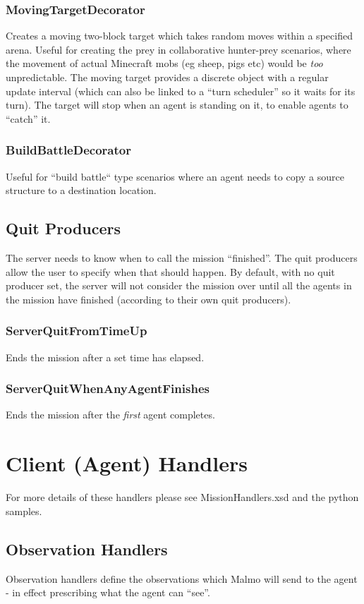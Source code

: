 \documentclass[11pt]{article} %
\begin{document}
\subsubsection{MovingTargetDecorator}
Creates a moving two-block target which takes random moves within a specified arena. Useful for creating the prey in collaborative hunter-prey scenarios, where the movement of actual Minecraft mobs (eg sheep, pigs etc) would be \emph{too} unpredictable. The moving target provides a discrete object with a regular update interval (which can also be linked to a ``turn scheduler'' so it waits for its turn). The target will stop when an agent is standing on it, to enable agents to ``catch'' it.

\subsubsection{BuildBattleDecorator}
Useful for ``build battle`` type scenarios where an agent needs to copy a source structure to a destination location.

\subsection{Quit Producers}
The server needs to know when to call the mission ``finished''. The quit producers allow the user to specify when that should happen. By default, with no quit producer set, the server will not consider the mission over until all the agents in the mission have finished (according to their own quit producers).

\subsubsection{ServerQuitFromTimeUp}
Ends the mission after a set time has elapsed.

\subsubsection{ServerQuitWhenAnyAgentFinishes}
Ends the mission after the \emph{first} agent completes.

\section{Client (Agent) Handlers}
For more details of these handlers please see MissionHandlers.xsd and the python samples.

\subsection{Observation Handlers}
Observation handlers define the observations which Malmo will send to the agent - in effect prescribing what the agent can ``see''.
\end{document}
